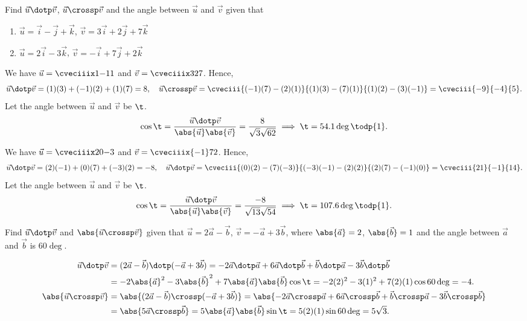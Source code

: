 \begin{problem}
    Find $\vec u \dotp \vec v$, $\vec u \crossp \vec v$ and the angle between $\vec u$ and $\vec v$ given that

    \begin{enumerate}
        \item $\vec u = \vec i - \vec j + \vec k$, $\vec v = 3\vec i + 2 \vec j + 7 \vec k$
        \item $\vec u = 2\vec i - 3\vec k$, $\vec v = -\vec i + 7 \vec j + 2\vec k$
    \end{enumerate}
\end{problem}
\begin{solution}
    \begin{ppart}
        We have $\vec u = \cveciiix1{-1}1$ and $\vec v = \cveciiix327$. Hence, \[\vec u \dotp \vec v = (1)(3) + (-1)(2) + (1)(7) = 8, \quad \vec u \crossp \vec v = \cveciii{(-1)(7) - (2)(1)}{(1)(3) - (7)(1)}{(1)(2) - (3)(-1)}= \cveciii{-9}{-4}{5}.\] Let the angle between $\vec u$ and $\vec v$ be $\t$. \[\cos \t = \frac{\vec u \dotp \vec v}{\abs{\vec u} \abs{\vec v}} = \frac{8}{\sqrt{3} \sqrt{62}} \implies \t = 54.1\deg \todp{1}.\]
    \end{ppart}
    \begin{ppart}
        We have $\vec u = \cveciiix20{-3}$ and $\vec v = \cveciiix{-1}72$. Hence, \[\vec u \dotp \vec v = (2)(-1) + (0)(7) + (-3)(2) = -8, \quad \vec u \dotp \vec v = \cveciii{(0)(2) - (7)(-3)}{(-3)(-1) - (2)(2)}{(2)(7) - (-1)(0)} = \cveciii{21}{-1}{14}.\] Let the angle between $\vec u$ and $\vec v$ be $\t$. \[\cos \t = \frac{\vec u \dotp \vec v}{\abs{\vec u}\abs{\vec v}} = \frac{-8}{\sqrt{13}\sqrt{54}} \implies \t = 107.6\deg \todp{1}.\]
    \end{ppart}
\end{solution}

\begin{problem}
    Find $\vec u \dotp \vec v$ and $\abs{\vec u \crossp \vec v}$ given that $\vec u = 2\vec a - \vec b$, $\vec v = -\vec a + 3 \vec b$, where $\abs{\vec a} = 2$, $\abs{\vec b} = 1$ and the angle between $\vec a$ and $\vec b$ is 60$\deg$.
\end{problem}
\begin{solution}
    \begin{align*}
        \vec u \dotp \vec v &= (2 \vec a - \vec b) \dotp (-\vec a + 3 \vec b) = -2\vec a \dotp \vec a + 6 \vec a \dotp \vec b + \vec b \dotp \vec a -3 \vec b \dotp \vec b\\ &= -2 \abs{\vec a}^2 - 3 \abs{\vec b}^2 + 7 \abs{\vec a}\abs{\vec b}\cos \t = -2(2)^2 - 3(1)^2 + 7(2)(1)\cos60\deg = -4.\\
        \abs{\vec u \crossp \vec v} &= \abs{(2 \vec a - \vec b) \crossp (-\vec a + 3 \vec b)} = \abs{-2\vec a \crossp \vec a + 6 \vec a \crossp \vec b + \vec b \crossp \vec a -3 \vec b \crossp \vec b}\\
        &= \abs{5 \vec a \crossp \vec b} = 5 \abs{\vec a} \abs{\vec b} \sin \t = 5(2)(1) \sin 60\deg = 5\sqrt3.
    \end{align*}
\end{solution}

